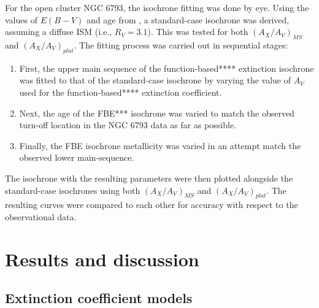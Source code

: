 \documentclass[12pt, a4paper]{report}
\begin{document}
For the open cluster NGC 6793, the isochrone fitting was done by eye. Using the values of $E(B-V)$ and age from \cite{2018A&A...616A..10G}, a standard-case isochrone was derived, assuming a diffuse ISM (i.e., $R_{V} = 3.1$). This was tested for both $(A_{X}/A_{V})_{MS}$ and $(A_{X}/A_{V})_{plat}$. The fitting process was carried out in sequential stages:
\begin{enumerate}
\item First, the upper main sequence of the function-based**** extinction isochrone was fitted to that of the standard-case isochrone by varying the value of $A_{V}$ used for the function-based**** extinction coefficient.
\item Next, the age of the FBE*** isochrone was varied to match the observed turn-off location in the NGC 6793 data as far as possible.
\item Finally, the FBE isochrone metallicity was varied in an attempt match the observed lower main-sequence.
\end{enumerate}

The isochrone with the resulting parameters were then plotted alongside the standard-case isochrones using both $(A_{X}/A_{V})_{MS}$ and $(A_{X}/A_{V})_{plat}$. The resulting curves were compared to each other for accuracy with respect to the observational data.

\chapter{Results and discussion}
\section{Extinction coefficient models} \label{coef_models}
\end{document}

